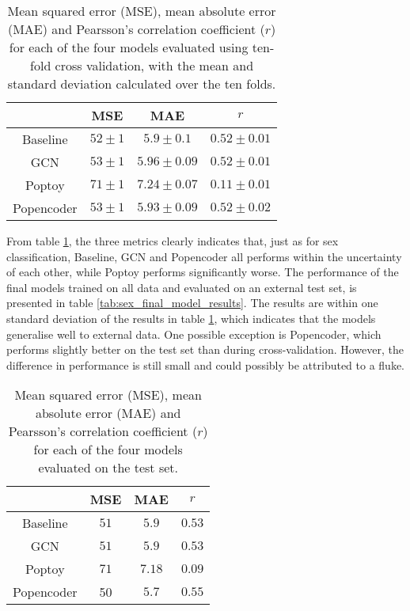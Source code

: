 \begin{table}[H]
    \centering
    \caption{Mean squared error (MSE), mean absolute error (MAE) and Pearsson's correlation coefficient ($r$) for each of the four models evaluated using ten-fold cross validation, with the mean and standard deviation calculated over the ten folds.}
    \begin{tabular}{c|c|c|c}
         &  MSE & MAE & $r$ \\ \hline 
        Baseline &$52\pm1$& $5.9\pm0.1$&$0.52\pm0.01$\\
        GCN & $53\pm1$& $5.96\pm 0.09 $& $0.52\pm0.01$\\
        Poptoy &$71\pm 1$ & $7.24\pm0.07$ &$ 0.11\pm 0.01$\\
        Popencoder &$53\pm1$& $5.93\pm 0.09$ & $0.52\pm0.02$\\
    \end{tabular}
    \label{tab:age_model_results}
\end{table}
From table \ref{tab:age_model_results}, the three metrics clearly indicates that, just as for sex classification, Baseline, GCN and Popencoder all performs within the uncertainty of each other, while Poptoy performs significantly worse. The performance of the final models trained on all data and evaluated on an external test set, is presented in table \ref{tab:sex_final_model_results}. The results are within one standard deviation of the results in table \ref{tab:age_model_results}, which indicates that the models generalise well to external data. One possible exception is Popencoder, which performs slightly better on the test set than during cross-validation. However, the difference in performance is still small and could possibly be attributed to a fluke.

\begin{table}[H]
    \centering
    \caption{Mean squared error (MSE), mean absolute error (MAE) and Pearsson's correlation coefficient ($r$) for each of the four models evaluated on the test set.}
    \begin{tabular}{c|c|c|c}
         &  MSE & MAE & $r$ \\ \hline 
        Baseline & $51 $& $5.9 $&$0.53 $\\
        GCN & $51 $& $5.9  $& $0.53 $\\
        Poptoy &$71 $ & $7.18 $ &$ 0.09 $\\
        Popencoder &50 & $5.7 $ & $0.55 $\\
    \end{tabular}
    \label{tab:age_final_model_results}
\end{table}

